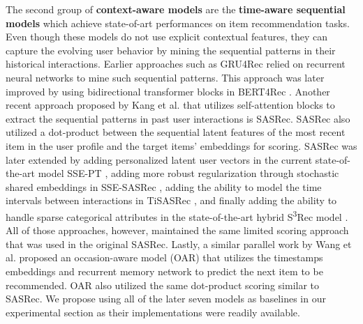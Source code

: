 \documentclass[sigconf,natbib=true]{acmart}
\begin{document}
The second group of \textbf{context-aware models} are the \textbf{time-aware sequential models} \cite{kang2018self,ma2019hierarchical,ZhouWZZWZWW20,wu2019stochastic,sun2019bert4rec,zhang2019feature,wang2020next,wang2020time,li2020time} which achieve state-of-art performances on item recommendation tasks. Even though these models do not use explicit contextual features, they can capture the evolving user behavior by mining the sequential patterns in their historical interactions. Earlier approaches such as GRU4Rec \cite{hidasi2018recurrent} relied on recurrent neural networks to mine such sequential patterns. This approach was later improved by using bidirectional transformer blocks in BERT4Rec \cite{sun2019bert4rec}. Another recent approach proposed by Kang et al. \cite{kang2018self} that utilizes self-attention blocks to extract the sequential patterns in past user interactions is SASRec. SASRec also utilized a dot-product between the sequential latent features of the most recent item in the user profile and the target items' embeddings for scoring. SASRec was later extended by adding personalized latent user vectors in the current state-of-the-art model SSE-PT \cite{wu2020sse}, adding more robust regularization through stochastic shared embeddings in SSE-SASRec \cite{wu2019stochastic}, adding the ability to model the time intervals between interactions in TiSASRec \cite{li2020time}, and finally adding the ability to handle sparse categorical attributes in the state-of-the-art hybrid S\textsuperscript{3}Rec model \cite{ZhouWZZWZWW20}. All of those approaches, however, maintained the same limited scoring approach that was used in the original SASRec. Lastly, a similar parallel work by Wang et al. \cite{wang2020time} proposed an occasion-aware model (OAR) that utilizes the timestamps embeddings and recurrent memory network to predict the next item to be recommended. OAR also utilized the same dot-product scoring similar to SASRec. We propose using all of the later seven models as baselines in our experimental section as their implementations were readily available. 
\end{document}
